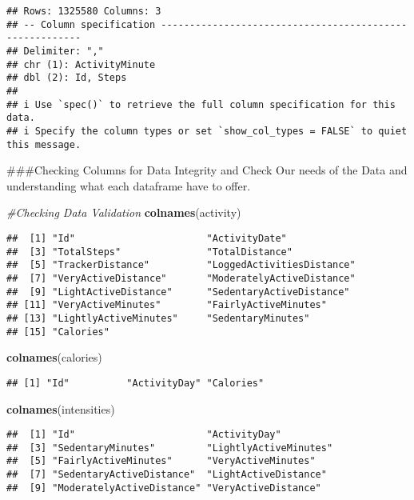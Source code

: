 \documentclass[
]{article}
\newenvironment{Shaded}{\begin{snugshade}}{\end{snugshade}}
\newcommand{\CommentTok}[1]{\textcolor[rgb]{0.56,0.35,0.01}{\textit{#1}}}
\newcommand{\FunctionTok}[1]{\textcolor[rgb]{0.13,0.29,0.53}{\textbf{#1}}}
\newcommand{\NormalTok}[1]{#1}
\begin{document}
\begin{verbatim}
## Rows: 1325580 Columns: 3
## -- Column specification --------------------------------------------------------
## Delimiter: ","
## chr (1): ActivityMinute
## dbl (2): Id, Steps
## 
## i Use `spec()` to retrieve the full column specification for this data.
## i Specify the column types or set `show_col_types = FALSE` to quiet this message.
\end{verbatim}

\#\#\#Checking Columns for Data Integrity and Check Our needs of the
Data and understanding what each dataframe have to offer.

\begin{Shaded}
\begin{Highlighting}[]
\CommentTok{\#Checking Data Validation }
\FunctionTok{colnames}\NormalTok{(activity)}
\end{Highlighting}
\end{Shaded}

\begin{verbatim}
##  [1] "Id"                       "ActivityDate"            
##  [3] "TotalSteps"               "TotalDistance"           
##  [5] "TrackerDistance"          "LoggedActivitiesDistance"
##  [7] "VeryActiveDistance"       "ModeratelyActiveDistance"
##  [9] "LightActiveDistance"      "SedentaryActiveDistance" 
## [11] "VeryActiveMinutes"        "FairlyActiveMinutes"     
## [13] "LightlyActiveMinutes"     "SedentaryMinutes"        
## [15] "Calories"
\end{verbatim}

\begin{Shaded}
\begin{Highlighting}[]
\FunctionTok{colnames}\NormalTok{(calories)}
\end{Highlighting}
\end{Shaded}

\begin{verbatim}
## [1] "Id"          "ActivityDay" "Calories"
\end{verbatim}

\begin{Shaded}
\begin{Highlighting}[]
\FunctionTok{colnames}\NormalTok{(intensities)}
\end{Highlighting}
\end{Shaded}

\begin{verbatim}
##  [1] "Id"                       "ActivityDay"             
##  [3] "SedentaryMinutes"         "LightlyActiveMinutes"    
##  [5] "FairlyActiveMinutes"      "VeryActiveMinutes"       
##  [7] "SedentaryActiveDistance"  "LightActiveDistance"     
##  [9] "ModeratelyActiveDistance" "VeryActiveDistance"
\end{verbatim}
\end{document}
